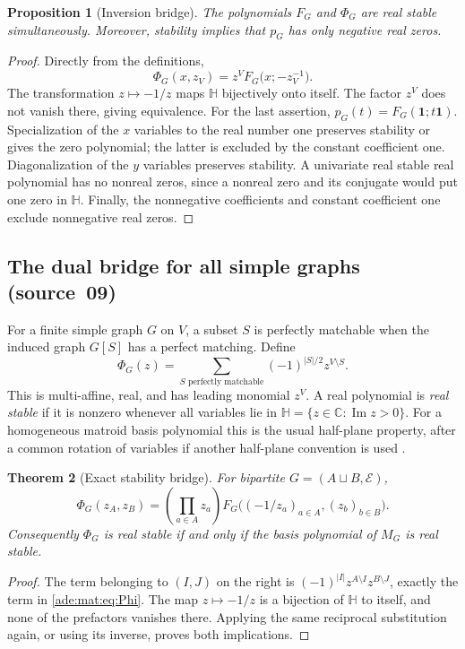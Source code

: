 \documentclass[11pt]{article}
\numberwithin{equation}{section}
\newtheorem{theorem}{Theorem}[section]
\newtheorem{proposition}[theorem]{Proposition}
\theoremstyle{definition}
\newcommand{\one}{\mathbf 1}
\newcommand{\C}{\mathbb C}
\newcommand{\HH}{\mathbb H}
\newcommand{\im}{\operatorname{Im}}
\begin{document}
\begin{proposition}[Inversion bridge]
\label{ade:prop:bridge}
The polynomials $F_G$ and $\Phi_G$ are real stable simultaneously.
Moreover, stability implies that $p_G$ has only negative real zeros.
\end{proposition}
\begin{proof}
Directly from the definitions,
\begin{equation}
 \Phi_G(x,z_V)=z^V F_G\bigl(x;-z_V^{-1}\bigr).
 \label{ade:eq:bridge}
\end{equation}
The transformation $z\mapsto-1/z$ maps $\HH$ bijectively onto itself.
The factor $z^V$ does not vanish there, giving equivalence.
For the last assertion,
$p_G(t)=F_G(\one;t\one)$.  Specialization of the $x$ variables to the
real number one preserves stability or gives the zero polynomial; the
latter is excluded by the constant coefficient one.  Diagonalization of
the $y$ variables preserves stability.  A univariate real stable real
polynomial has no nonreal zeros, since a nonreal zero and its conjugate
would put one zero in $\HH$.  Finally, the nonnegative coefficients and
constant coefficient one exclude nonnegative real zeros.
\end{proof}


\subsection{The dual bridge for all simple graphs (source~09)}
\label{ade:mat:sec:stability}
For a finite simple graph $G$ on $V$, a subset $S$ is perfectly matchable
when the induced graph $G[S]$ has a perfect matching. Define
\begin{equation}
 \Phi_G(z)=\sum_{S\text{ perfectly matchable}}
                     (-1)^{|S|/2}z^{V\setminus S}.
\label{ade:mat:eq:Phi}
\end{equation}
This is multi-affine, real, and has leading monomial $z^V$.
A real polynomial is \emph{real stable} if it is nonzero whenever all
variables lie in $\HH=\{z\in\C:\im z>0\}$. For a homogeneous matroid
basis polynomial this is the usual half-plane property, after a common
rotation of variables if another half-plane convention is used
\cite{Branden}.

\begin{theorem}[Exact stability bridge]\label{ade:mat:thm:stable-bridge}
For bipartite $G=(A\sqcup B,\mathcal E)$,
\begin{equation}
 \Phi_G(z_A,z_B)=
 \left(\prod_{a\in A}z_a\right)
 F_G\bigl((-1/z_a)_{a\in A},(z_b)_{b\in B}\bigr).
\label{ade:mat:eq:reciprocal}
\end{equation}
Consequently $\Phi_G$ is real stable if and only if the basis polynomial of
$M_G$ is real stable.
\end{theorem}
\begin{proof}
The term belonging to $(I,J)$ on the right is
$(-1)^{|I|}z^{A\setminus I}z^{B\setminus J}$, exactly the term in
\eqref{ade:mat:eq:Phi}. The map $z\mapsto-1/z$ is a bijection of $\HH$ to itself,
and none of the prefactors vanishes there. Applying the same reciprocal
substitution again, or using its inverse, proves both implications.
\end{proof}
\end{document}
